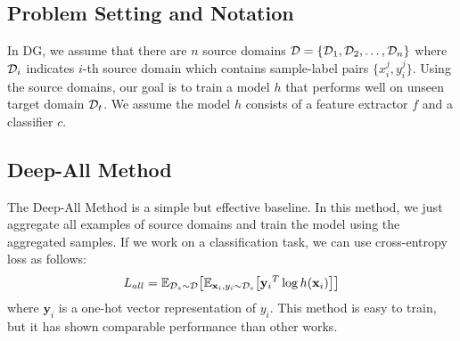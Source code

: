 \subsection{Problem Setting and Notation}
In DG, we assume that there are $n$ source domains $\mathcal{D} = \{\mathcal{D}_1, \mathcal{D}_2, \dots, \mathcal{D}_n\}$ where $\mathcal{D}_i$ indicates $i$-th source domain which contains sample-label pairs $\{x_i^j, y_i^j\}$. Using the source domains, our goal is to train a model $h$ that performs well on unseen target domain $\mathcal{D}_t$. We assume the model $h$ consists of a feature extractor $f$ and a classifier $c$. 

\subsection{Deep-All Method}
The Deep-All Method is a simple but effective baseline. In this method, we just aggregate all examples of source domains and train the model using the aggregated samples. If we work on a classification task, we can use cross-entropy loss as follows:
\begin{equation}
\label{eq:agg}
\begin{aligned}
L_{all} = \mathbb{E}_{\mathcal{D}_s\sim\mathcal{D}} \big[ \mathbb{E}_{\mathbf{x}_i,y_i\sim \mathcal{D}_s} \big[  {\mathbf{y}_i}^{T} \log h(\mathbf{x}_i) \big] \big]
\end{aligned}
\end{equation}
where $\mathbf{y}_i$ is a one-hot vector representation of $y_i$. This method is easy to train, but it has shown comparable performance than other works.

\begin{table*}[t]
	\centering
	\vspace{-0.2cm}
	\caption{\small Cross-domain object classification results (accuracy. \%) on PACS using AlexNet.}
	\label{tab:pacs}
\end{table*}

